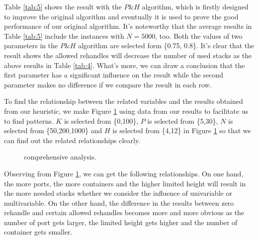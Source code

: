 \documentclass[review,3p,times,authoryear,12pt]{elsarticle}
\begin{document}
Table \ref{tab:5} shows the result with the $P\&H$ algorithm, which is firstly designed to improve the original algorithm and eventually it is used to prove the good performance of our original algorithm.
It's noteworthy that the average results in Table \ref{tab:5} include the instances with $N=5000$, too.
Both the values of two parameters in the $P\&H$ algorithm are selected form \{0.75, 0.8\}.
It's clear that the result shows the allowed rehandles will decrease the number of used stacks as the above results in Table \ref{tab:4}.
What's more, we can draw a conclusion that the first parameter has a significant influence on the result while the second parameter makes no difference if we compare the result in each row.

To find the relationship between the related variables and the results obtained from our heuristic, we make Figure \ref{fig 5:graph} using data from our results to facilitate us to find patterns.
$K$ is selected from \{0,100\}, $P$ is selected from \{5,30\}, $N$ is selected from \{50,200,1000\} and $H$ is selected from \{4,12\} in Figure \ref{fig 5:graph} so that we can find out the related relationships clearly.

\begin{figure}[htbp]
\centering
\setlength{\abovecaptionskip}{10pt}
\caption{comprehensive analysis.}
\label{fig 5:graph}
\end{figure}

Observing from Figure \ref{fig 5:graph}, we can get the following relationships.
On one hand, the more ports, the more containers and the higher limited height will result in the more needed stacks whether we consider the influence of univariable or multivariable.
On the other hand, the difference in the results between zero rehandle and certain allowed rehandles becomes more and more obvious as the number of port gets larger, the limited height gets higher and the number of container gets smaller.
\end{document}
